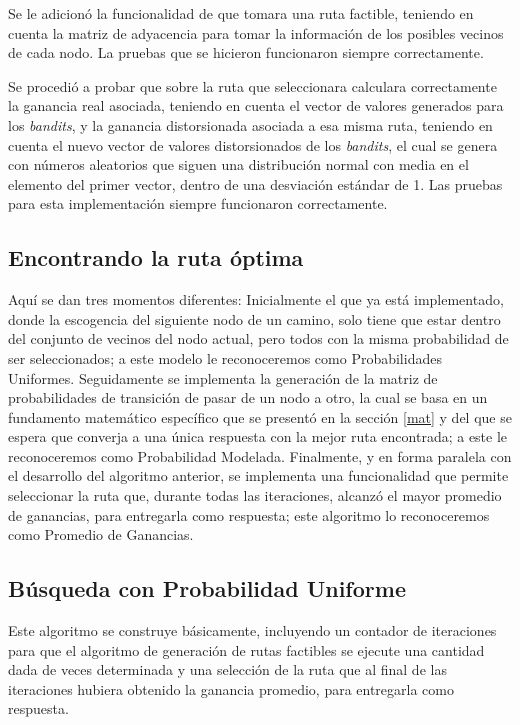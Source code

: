 Se le adicionó la funcionalidad de que tomara una ruta factible, teniendo en cuenta la matriz de adyacencia para tomar la información de los posibles vecinos de cada nodo. La pruebas que se hicieron funcionaron siempre correctamente.

Se procedió a probar que sobre la ruta que seleccionara calculara correctamente la ganancia real asociada, teniendo en cuenta el vector de valores generados para los \textit{bandits}, y la ganancia distorsionada asociada a esa misma ruta, teniendo en cuenta el nuevo vector de valores distorsionados de los \textit{bandits}, el cual se genera con números aleatorios que siguen una distribución normal con media en el elemento del primer vector, dentro de una desviación estándar de 1. Las pruebas para esta implementación siempre funcionaron correctamente.

\subsection{Encontrando la ruta óptima}

Aquí se dan tres momentos diferentes: Inicialmente el que ya está implementado, donde la escogencia del siguiente nodo de un camino, solo tiene que estar dentro del conjunto de vecinos del nodo actual, pero todos con la misma probabilidad de ser seleccionados; a este modelo le reconoceremos como Probabilidades Uniformes. Seguidamente se implementa la generación de la matriz de probabilidades de transición de pasar de un nodo a otro, la cual se basa en un fundamento matemático específico que se presentó en la sección \ref{mat} y del que se espera que converja a una única respuesta con la mejor ruta encontrada; a este le reconoceremos como Probabilidad Modelada. Finalmente, y en forma paralela con el desarrollo del algoritmo anterior, se implementa una funcionalidad que permite seleccionar la ruta que, durante todas las iteraciones, alcanzó el mayor promedio de ganancias, para entregarla como respuesta; este algoritmo lo reconoceremos como Promedio de Ganancias.

\subsection{Búsqueda con Probabilidad Uniforme}

Este algoritmo se construye básicamente, incluyendo un contador de iteraciones para que el algoritmo de generación de rutas factibles se ejecute una cantidad dada de veces determinada y una selección de la ruta que al final de las iteraciones hubiera obtenido la ganancia promedio, para entregarla como respuesta. 

